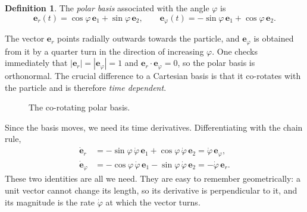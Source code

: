 \documentclass[11pt,a4paper,oneside]{report}
\numberwithin{equation}{chapter}
\newcommand{\vect}[1]{\bm{#1}}
\newcommand{\e}[1]{\vect{e}_{#1}}
\theoremstyle{plain}
\theoremstyle{definition}
\newtheorem{definition}[theorem]{Definition}
\theoremstyle{remark}
\begin{document}
\begin{definition}
The \emph{polar basis} associated with the angle $\varphi$ is
\begin{equation}
  \e r(t)=\cos\varphi\,\e1+\sin\varphi\,\e2,\qquad \e\varphi(t)=-\sin\varphi\,\e1+\cos\varphi\,\e2 .
\end{equation}
\end{definition}

The vector $\e r$ points radially outwards towards the particle, and $\e\varphi$ is obtained from it by a quarter
turn in the direction of increasing $\varphi$. One checks immediately that $|\e r|=|\e\varphi|=1$ and
$\e r\cdot\e\varphi=0$, so the polar basis is orthonormal. The crucial difference to a Cartesian basis is that it
co-rotates with the particle and is therefore \emph{time dependent}.

\begin{figure}[ht]
\centering
{}
\caption{The co-rotating polar basis.}
\end{figure}

Since the basis moves, we need its time derivatives. Differentiating with the chain rule,
\begin{align}
  \dot{\vect e}_r&=-\sin\varphi\,\dot\varphi\,\e1+\cos\varphi\,\dot\varphi\,\e2=\dot\varphi\,\e\varphi,\label{eq:der-er}\\
  \dot{\vect e}_\varphi&=-\cos\varphi\,\dot\varphi\,\e1-\sin\varphi\,\dot\varphi\,\e2=-\dot\varphi\,\e r.\label{eq:der-ephi}
\end{align}
These two identities are all we need. They are easy to remember geometrically: a unit vector cannot change its
length, so its derivative is perpendicular to it, and its magnitude is the rate $\dot\varphi$ at which the vector
turns.
\end{document}
